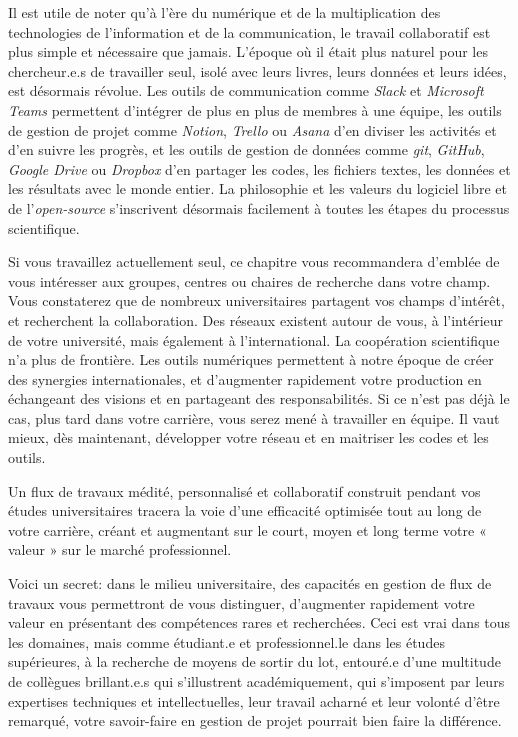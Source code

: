 \documentclass[
  letterpaper,
  DIV=11,
  numbers=noendperiod]{scrreprt}
\begin{document}
Il est utile de noter qu'à l'ère du numérique et de la multiplication
des technologies de l'information et de la communication, le travail
collaboratif est plus simple et nécessaire que jamais. L'époque où il
était plus naturel pour les chercheur.e.s de travailler seul, isolé avec
leurs livres, leurs données et leurs idées, est désormais révolue. Les
outils de communication comme \emph{Slack} et \emph{Microsoft Teams}
permettent d'intégrer de plus en plus de membres à une équipe, les
outils de gestion de projet comme \emph{Notion}, \emph{Trello} ou
\emph{Asana} d'en diviser les activités et d'en suivre les progrès, et
les outils de gestion de données comme \emph{git}, \emph{GitHub},
\emph{Google Drive} ou \emph{Dropbox} d'en partager les codes, les
fichiers textes, les données et les résultats avec le monde entier. La
philosophie et les valeurs du logiciel libre et de l'\emph{open-source}
s'inscrivent désormais facilement à toutes les étapes du processus
scientifique.

Si vous travaillez actuellement seul, ce chapitre vous recommandera
d'emblée de vous intéresser aux groupes, centres ou chaires de recherche
dans votre champ. Vous constaterez que de nombreux universitaires
partagent vos champs d'intérêt, et recherchent la collaboration. Des
réseaux existent autour de vous, à l'intérieur de votre université, mais
également à l'international. La coopération scientifique n'a plus de
frontière. Les outils numériques permettent à notre époque de créer des
synergies internationales, et d'augmenter rapidement votre production en
échangeant des visions et en partageant des responsabilités. Si ce n'est
pas déjà le cas, plus tard dans votre carrière, vous serez mené à
travailler en équipe. Il vaut mieux, dès maintenant, développer votre
réseau et en maitriser les codes et les outils.

Un flux de travaux médité, personnalisé et collaboratif construit
pendant vos études universitaires tracera la voie d'une efficacité
optimisée tout au long de votre carrière, créant et augmentant sur le
court, moyen et long terme votre « valeur » sur le marché professionnel.

Voici un secret: dans le milieu universitaire, des capacités en gestion
de flux de travaux vous permettront de vous distinguer, d'augmenter
rapidement votre valeur en présentant des compétences rares et
recherchées. Ceci est vrai dans tous les domaines, mais comme étudiant.e
et professionnel.le dans les études supérieures, à la recherche de
moyens de sortir du lot, entouré.e d'une multitude de collègues
brillant.e.s qui s'illustrent académiquement, qui s'imposent par leurs
expertises techniques et intellectuelles, leur travail acharné et leur
volonté d'être remarqué, votre savoir-faire en gestion de projet
pourrait bien faire la différence.
\end{document}
